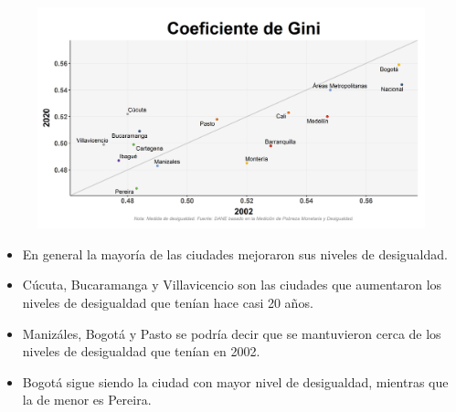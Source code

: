     \begin{figure}[H]
        \caption[Coeficiente de Gini por ciudades - 2002 VS 2020 ]{\label{gini_ciudades_vs} }
        \begin{center}
        \includegraphics[width=\textwidth,keepaspectratio]{img/var_253_scatter_time.png}
        \end{center}
    \end{figure}
            \begin{itemize}
                    \item En general la mayoría de las ciudades mejoraron sus niveles de desigualdad.
                    \item Cúcuta, Bucaramanga y Villavicencio son las ciudades que aumentaron los niveles de desigualdad que tenían hace casi 20 años.
                    \item Manizáles, Bogotá y Pasto se podría decir que se mantuvieron cerca de los niveles de desigualdad que tenían en 2002.
                    \item Bogotá sigue siendo la ciudad con mayor nivel de desigualdad, mientras que la de menor es Pereira.
                    \end{itemize}


